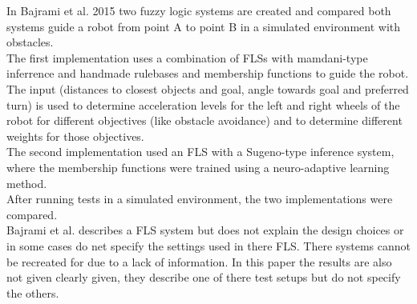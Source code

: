\documentclass[conference]{IEEEtran}
\begin{document}
In Bajrami et al. 2015 \cite{bajrami2015artificial} two fuzzy logic systems are created and compared both systems guide a robot from point A to point B in a simulated environment with obstacles.\\
The first implementation uses a combination of FLSs with mamdani-type inferrence and handmade rulebases and membership functions to guide the robot. The input (distances to closest objects and goal, angle towards goal and preferred turn) is used to determine acceleration levels for the left and right wheels of the robot for different objectives (like obstacle avoidance) and to determine different weights for those objectives.\\
The second implementation used an FLS with a Sugeno-type inference system, where the membership functions were trained using a neuro-adaptive learning method.\\
After running tests in a simulated environment, the two implementations were compared.\\
Bajrami et al. \cite{bajrami2015artificial} describes a FLS system but does not explain the design choices or in some cases do net specify the settings used in there FLS. There systems cannot be recreated for due to a lack of information. In this paper the results are also not given clearly given, they describe one of there test setups but do not specify the others.
\end{document}
